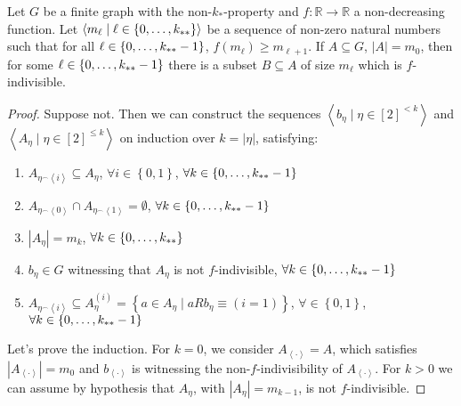     \lemma[Claim 4.3]\label{existance_of_indivisible_sets}
        Let $G$ be a finite graph with the non-$k_*$-property and $f: \mathbb{R} \longrightarrow \mathbb{R}$ a non-decreasing function.
        Let $\left< m_\ell \mid \ell \in \left\{ 0, \dots, k_{**} \right\} \right>$ be a sequence of non-zero natural numbers such that
        for all $\ell \in \left\{ 0, \dots, k_{**}-1 \right\}$, $f(m_{\ell}) \geq m_{\ell+1}$.
        If $A \subseteq G$, $|A| = m_0$, then for some $\ell \in \left\{ 0, \dots, k_{**}-1 \right\}$ there is a subset $B \subseteq A$
        of size $m_\ell$ which is $f$-indivisible.
        \begin{proof}
            Suppose not.
            Then we can construct the sequences $\left< b_\eta \mid \eta \in [2]^{<k} \right>$ and $\left< A_\eta \mid \eta \in [2]^{\leq k} \right>$
            on induction over $k = |\eta|$, satisfying:
            \begin{enumerate}
                \item\label{itm:4.3.1} $A_{\eta^\frown \left< i \right>} \subseteq A_{\eta}$, $\forall i \in \left\{0,1\right\}$, $\forall k \in \left\{ 0, \dots, k_{**}-1 \right\}$
                \item\label{itm:4.3.2} $A_{\eta^\frown \left< 0 \right>} \cap A_{\eta^\frown \left< 1 \right>} = \emptyset$, $\forall k \in \left\{ 0, \dots, k_{**}-1 \right\}$
                \item\label{itm:4.3.3} $|A_\eta| = m_k$, $\forall k \in \left\{ 0, \dots, k_{**} \right\}$
                \item\label{itm:4.3.4} $b_\eta \in G$ witnessing that $A_\eta$ is not $f$-indivisible, $\forall k \in \left\{ 0, \dots, k_{**}-1 \right\}$
                \item\label{itm:4.3.5} $A_{\eta^\frown \left< i \right>} \subseteq A_\eta^{(i)} = \left\{ a \in A_\eta \mid a R b_\eta \equiv (i=1) \right\}$,
                    $\forall \in \left\{ 0,1 \right\}$, $\forall k \in \left\{ 0, \dots, k_{**}-1 \right\}$
            \end{enumerate}
            Let's prove the induction.
            For $k=0$, we consider $A_{\left< \cdot \right>} = A$, which satisfies $|A_{\left< \cdot \right>}| = m_0$ and
            $b_{\left< \cdot \right>}$ is witnessing the non-$f$-indivisibility of $A_{\left< \cdot \right>}$.
            For $k > 0$ we can assume by hypothesis that $A_\eta$, with $|A_\eta| = m_{k-1}$, is not $f$-indivisible.

\end{proof}
